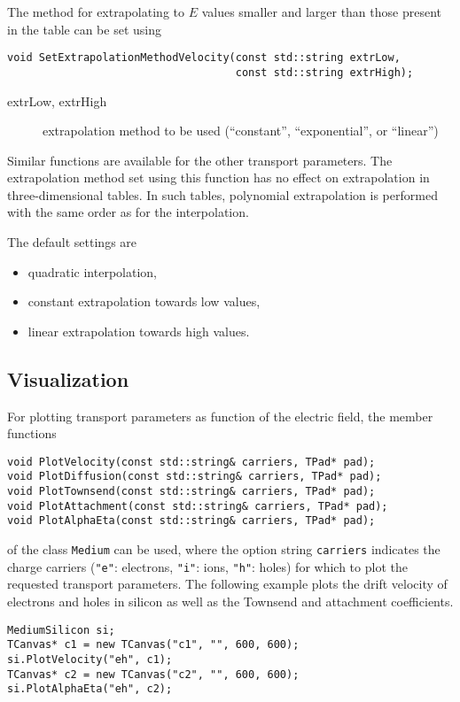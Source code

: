 The method for extrapolating to \(E\) values smaller and larger 
than those present in the table can be set using 
\begin{lstlisting}
void SetExtrapolationMethodVelocity(const std::string extrLow,
                                    const std::string extrHigh);
\end{lstlisting}
\begin{description}
\item[extrLow, extrHigh] extrapolation method to be used 
(``constant'', ``exponential'', or ``linear'')
\end{description}
Similar functions are available for the other transport parameters. 
The extrapolation method set using this function has no effect on 
extrapolation in three-dimensional tables. 
In such tables, polynomial extrapolation is performed with the same 
order as for the interpolation.

The default settings are
\begin{itemize}
  \item
  quadratic interpolation,
  \item
  constant extrapolation towards low values,
  \item
  linear extrapolation towards high values.
\end{itemize}

\subsection{Visualization}
For plotting transport parameters as function of the electric field, 
the member functions
\begin{lstlisting}
void PlotVelocity(const std::string& carriers, TPad* pad);
void PlotDiffusion(const std::string& carriers, TPad* pad);
void PlotTownsend(const std::string& carriers, TPad* pad);
void PlotAttachment(const std::string& carriers, TPad* pad);
void PlotAlphaEta(const std::string& carriers, TPad* pad);
\end{lstlisting}
of the class \texttt{Medium} can be used, where the option string 
\texttt{carriers} indicates the charge carriers (\texttt{"e"}: electrons, \texttt{"i"}: ions, \texttt{"h"}: holes) for which to plot the requested 
transport parameters. 
The following example plots the drift velocity of electrons and holes in silicon as well as the Townsend and attachment coefficients.
\begin{lstlisting}
MediumSilicon si;
TCanvas* c1 = new TCanvas("c1", "", 600, 600);
si.PlotVelocity("eh", c1);
TCanvas* c2 = new TCanvas("c2", "", 600, 600);
si.PlotAlphaEta("eh", c2);
\end{lstlisting} 

